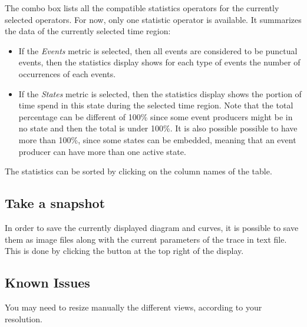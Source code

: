 \documentclass[twoside]{article}
\begin{document}
\begin{sloppypar}
The combo box lists all the compatible statistics operators for the currently selected operators. For now, only one statistic operator is available. It summarizes the data of the currently selected time region:
\begin{itemize} 
	\item If the \textit{Events} metric is selected, then all events are considered to be punctual events, then the statistics display shows for each type of events the number of occurrences of each events.
	\item If the \textit{States} metric is selected, then the statistics display shows the portion of time spend in this state during the selected time region. Note that the total percentage can be different of 100\% since some event producers might be in no state and then the total is under 100\%. It is also possible possible to have more than 100\%, since some states can be embedded, meaning that an event producer can have more than one active state.
\end{itemize}

The statistics can be sorted by clicking on the column names of the table.

\subsection{Take a snapshot}
In order to save the currently displayed diagram and curves, it is possible to save them as image files along with the current parameters of the trace in text file. This is done by clicking the button at the top right of the display.

\subsection{Known Issues}
You may need to resize manually the different views, according to your resolution.

\newpage

\newpage

{}

\end{sloppypar} 
\end{document}

